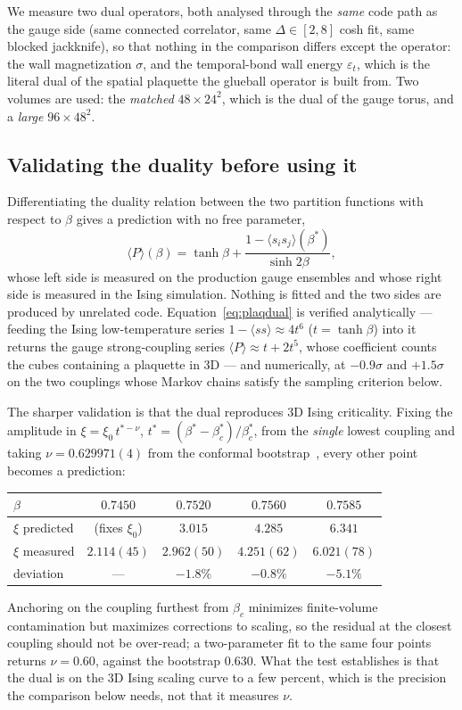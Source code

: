 \documentclass[aps,prl,reprint,superscriptaddress,nofootinbib]{revtex4-2}
\begin{document}
We measure two dual operators, both analysed through the \emph{same} code path as
the gauge side (same connected correlator, same $\Delta\in[2,8]$ cosh fit, same
blocked jackknife), so that nothing in the comparison differs except the
operator: the wall magnetization $\sigma$, and the temporal-bond wall energy
$\varepsilon_t$, which is the literal dual of the spatial plaquette the glueball
operator is built from. Two volumes are used: the \emph{matched} $48\times24^2$,
which is the dual of the gauge torus, and a \emph{large} $96\times48^2$.

\subsection{Validating the duality before using it}

Differentiating the duality relation between the two partition functions with
respect to $\beta$ gives a prediction with no free parameter,
\begin{equation}
  \langle P\rangle(\beta)
  =\tanh\beta+\frac{1-\langle s_is_j\rangle(\beta^\ast)}{\sinh2\beta},
  \label{eq:plaqdual}
\end{equation}
whose left side is measured on the production gauge ensembles and whose right
side is measured in the Ising simulation. Nothing is fitted and the two sides are
produced by unrelated code. Equation~\eqref{eq:plaqdual} is verified analytically
--- feeding the Ising low-temperature series $1-\langle ss\rangle\approx4t^6$
($t=\tanh\beta$) into it returns the gauge strong-coupling series
$\langle P\rangle\approx t+2t^5$, whose coefficient counts the cubes containing a
plaquette in 3D --- and numerically, at $-0.9\sigma$ and $+1.5\sigma$ on the two
couplings whose Markov chains satisfy the sampling criterion below.

The sharper validation is that the dual reproduces 3D Ising criticality. Fixing
the amplitude in $\xi=\xi_0\,t^{\ast-\nu}$,
$t^\ast=(\beta^\ast-\beta^\ast_c)/\beta^\ast_c$, from the \emph{single} lowest
coupling and taking $\nu=0.629971(4)$ from the conformal
bootstrap~\cite{Kos2016}, every other point becomes a prediction:
\begin{center}\footnotesize
\begin{tabular}{@{}lcccc@{}}
\toprule
$\beta$ & $0.7450$ & $0.7520$ & $0.7560$ & $0.7585$\\
\midrule
$\xi$ predicted & (fixes $\xi_0$) & $3.015$ & $4.285$ & $6.341$\\
$\xi$ measured & $2.114(45)$ & $2.962(50)$ & $4.251(62)$ & $6.021(78)$\\
deviation & --- & $-1.8\%$ & $-0.8\%$ & $-5.1\%$\\
\bottomrule
\end{tabular}
\end{center}
Anchoring on the coupling furthest from $\beta_c$ minimizes finite-volume
contamination but maximizes corrections to scaling, so the residual at the
closest coupling should not be over-read; a two-parameter fit to the same four
points returns $\nu=0.60$, against the bootstrap $0.630$. What the test
establishes is that the dual is on the 3D Ising scaling curve to a few percent,
which is the precision the comparison below needs, not that it measures $\nu$.
\end{document}
